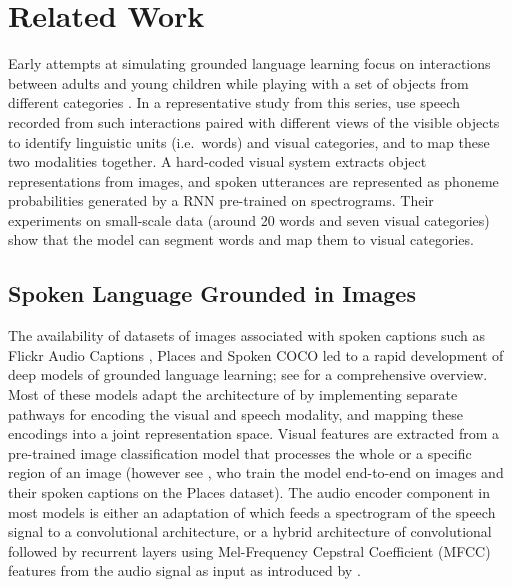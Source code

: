 \section{Related Work}
\label{sec:related}

Early attempts at simulating grounded language learning focus on
interactions between adults and young children while playing with a
set of objects from different categories \cite{roy1999learning,roy2002learning,
  gorniak2003visually,mukherjee2003visual}. In a representative study
from this series, \citet{roypentland2002learning} use speech recorded from
such interactions paired with different views of the visible objects
to identify linguistic units (i.e.\ words) and visual categories, and
to map these two modalities together. A hard-coded visual system
extracts object representations from images, and spoken utterances are
represented as phoneme probabilities generated by a RNN pre-trained on
spectrograms.  Their experiments on small-scale data (around 20 words
and seven visual categories) show that the model can segment words and
map them to visual categories.

\subsection{Spoken Language Grounded in Images}
\label{sec:images}
The availability of datasets of images associated with spoken captions
such as Flickr Audio Captions \citep{harwath2015deep}, Places
\cite{zhou2014learning} and Spoken COCO \citep{hsu2019transfer} led to
a rapid development of deep models of grounded language learning; see
\citet{chrupala-visually-2021} for a comprehensive overview. 
 Most of
these models adapt the architecture of \citet{karpathy2014deep} by
implementing separate pathways for encoding the visual and speech
modality, and mapping these encodings into a joint representation
space. Visual features are extracted from a pre-trained
image classification model that processes the whole or a specific
region of an image (however see \citet{harwath2018jointly}, who train the
model end-to-end on images and their spoken captions on the Places
dataset). The audio encoder component in most models is 
either an adaptation of \citet{harwath2016unsupervised} which feeds a
spectrogram of the speech signal to a convolutional architecture, or a
hybrid architecture of convolutional followed by recurrent layers using
Mel-Frequency Cepstral Coefficient (MFCC) features from the audio
signal as input as introduced by \citet{chrupala-etal-2017-representations}.

